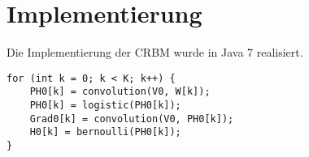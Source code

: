 \section{Implementierung}\label{implementation}
Die Implementierung der CRBM wurde in Java 7 realisiert.
\newline
\newline 
\begin{lstlisting}
for (int k = 0; k < K; k++) {
	PH0[k] = convolution(V0, W[k]);
	PH0[k] = logistic(PH0[k]);
	Grad0[k] = convolution(V0, PH0[k]);
	H0[k] = bernoulli(PH0[k]);
}
\end{lstlisting}